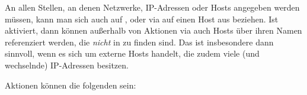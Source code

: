 An allen Stellen, an denen Netzwerke, IP-Adressen oder Hosts angegeben werden
müssen, kann man sich auch auf ,  oder
via  auf einen Host aus  beziehen. Ist
 aktiviert, dann können außerhalb von Aktionen via 
auch Hosts über ihren Namen referenziert werden, die \emph{nicht} in
 zu finden sind. Das ist insbesondere dann sinnvoll, wenn es
sich um externe Hosts handelt, die zudem viele (und wechselnde) IP-Adressen
besitzen.


Aktionen können die folgenden sein:
